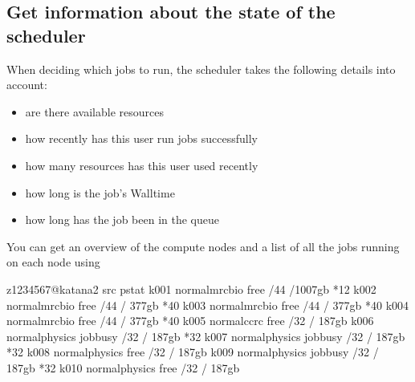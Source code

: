 \documentclass[letterpaper,10pt,english]{sphinxmanual}
\begin{document}
\subsection{Get information about the state of the scheduler}
\label{\detokenize{using_katana/running_jobs:get-information-about-the-state-of-the-scheduler}}\label{\detokenize{using_katana/running_jobs:state-of-pbs}}
When deciding which jobs to run, the scheduler takes the following details into account:
\begin{itemize}
\item {} 
are there available resources

\item {} 
how recently has this user run jobs successfully

\item {} 
how many resources has this user used recently

\item {} 
how long is the job’s Walltime

\item {} 
how long has the job been in the queue

\end{itemize}

You can get an overview of the compute nodes and a list of all the jobs running on each node using 

\begin{sphinxVerbatim}[commandchars=\\\{\}]
\PYG{o}{[}z1234567@katana2 src\PYG{o}{]}\PYGZdl{} pstat
k001  normal\PYGZhy{}mrcbio           free          /44   /1007gb  *12
k002  normal\PYGZhy{}mrcbio           free          /44    / 377gb  *40
k003  normal\PYGZhy{}mrcbio           free          /44   / 377gb  *40
k004  normal\PYGZhy{}mrcbio           free          /44    / 377gb  *40
k005  normal\PYGZhy{}ccrc             free           /32     / 187gb
k006  normal\PYGZhy{}physics          job\PYGZhy{}busy      /32   / 187gb  *32
k007  normal\PYGZhy{}physics          job\PYGZhy{}busy      /32   / 187gb  *32
k008  normal\PYGZhy{}physics          free           /32     / 187gb
k009  normal\PYGZhy{}physics          job\PYGZhy{}busy      /32   / 187gb  *32
k010  normal\PYGZhy{}physics          free           /32     / 187gb
\end{sphinxVerbatim}
\end{document}
